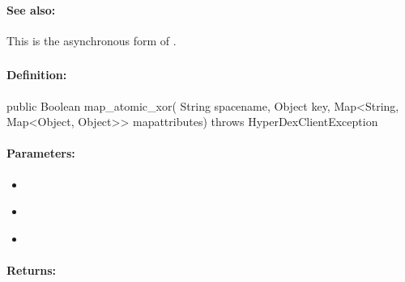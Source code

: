 \paragraph{See also:}  This is the asynchronous form of .

\pagebreak
\subsubsection{}
\label{api:java:map_atomic_xor}


\paragraph{Definition:}
\begin{javacode}
public Boolean map_atomic_xor(
        String spacename,
        Object key,
        Map<String, Map<Object, Object>> mapattributes) throws HyperDexClientException
\end{javacode}

\paragraph{Parameters:}
\begin{itemize}[noitemsep]
\item {}\\

\item {}\\

\item {}\\

\end{itemize}

\paragraph{Returns:}


\pagebreak
\subsubsection{}
\label{api:java:async_map_atomic_xor}


